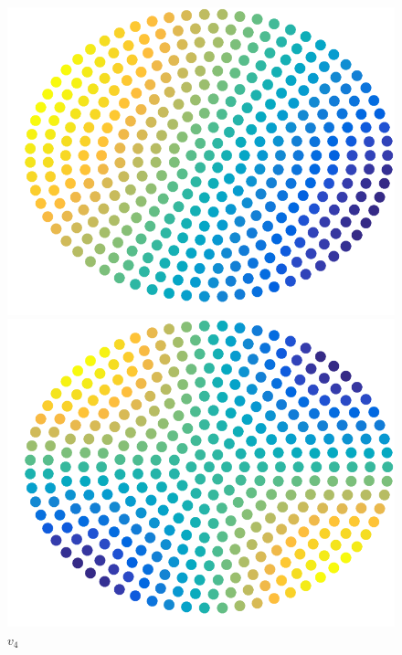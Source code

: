 \documentclass{beamer}
\begin{document}
\begin{frame}
\begin{figure}
    \hfill
        \begin{minipage}[b]{0.18\linewidth}
      \centering
      \includegraphics[width=\textwidth]{./Images/DiscExample/GraphLaplacian/evec03.png}
      \caption{\tiny $v_3$}
    \end{minipage}
    \begin{minipage}[b]{0.18\linewidth}
      \centering
      \includegraphics[width=\textwidth]{./Images/DiscExample/GraphLaplacian/evec04.png}
      \caption{\tiny $v_4$}
    \end{minipage}
    \hfill
    \begin{minipage}[b]{0.18\linewidth}

\end{minipage}
\end{figure}
\end{frame}
\end{document}
